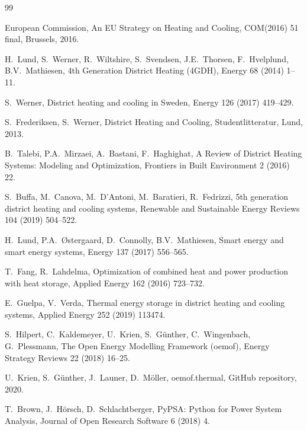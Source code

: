 \documentclass[review,3p]{elsarticle}
\begin{document}

\begin{thebibliography}{99}

European Commission, An EU Strategy on Heating and Cooling,
COM(2016) 51 final, Brussels, 2016.

H.\ Lund, S.\ Werner, R.\ Wiltshire, S.\ Svendsen, J.E.\ Thorsen,
F.\ Hvelplund, B.V.\ Mathiesen,
4th Generation District Heating (4GDH),
Energy 68 (2014) 1--11.

S.\ Werner,
District heating and cooling in Sweden,
Energy 126 (2017) 419--429.

S.\ Frederiksen, S.\ Werner,
District Heating and Cooling, Studentlitteratur, Lund, 2013.

B.\ Talebi, P.A.\ Mirzaei, A.\ Bastani, F.\ Haghighat,
A Review of District Heating Systems: Modeling and Optimization,
Frontiers in Built Environment 2 (2016) 22.

S.\ Buffa, M.\ Canova, M.\ D'Antoni, M.\ Baratieri, R.\ Fedrizzi,
5th generation district heating and cooling systems,
Renewable and Sustainable Energy Reviews 104 (2019) 504--522.

H.\ Lund, P.A.\ Østergaard, D.\ Connolly, B.V.\ Mathiesen,
Smart energy and smart energy systems,
Energy 137 (2017) 556--565.

T.\ Fang, R.\ Lahdelma,
Optimization of combined heat and power production with heat storage,
Applied Energy 162 (2016) 723--732.

E.\ Guelpa, V.\ Verda,
Thermal energy storage in district heating and cooling systems,
Applied Energy 252 (2019) 113474.

S.\ Hilpert, C.\ Kaldemeyer, U.\ Krien, S.\ Günther,
C.\ Wingenbach, G.\ Plessmann,
The Open Energy Modelling Framework (oemof),
Energy Strategy Reviews 22 (2018) 16--25.

U.\ Krien, S.\ Günther, J.\ Launer, D.\ Möller,
oemof.thermal, GitHub repository, 2020.

T.\ Brown, J.\ Hörsch, D.\ Schlachtberger,
PyPSA: Python for Power System Analysis,
Journal of Open Research Software 6 (2018) 4.


\end{thebibliography}
\end{document}
